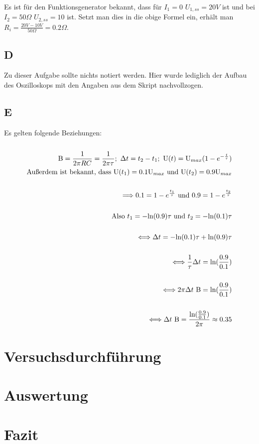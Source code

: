 Es ist für den Funktionsgenerator bekannt, dass für $I_1 = 0$ $U_{1, ss} = 20V$ ist und bei $I_2 = 50\Omega$ $U_{2, ss} = 10$ ist. Setzt man dies in die obige Formel ein, erhält man $R_i = \frac{20V - 10V}{50\Omega} = 0.2\Omega$.


\section{D}
Zu dieser Aufgabe sollte nichts notiert werden. Hier wurde lediglich der Aufbau des Oszilloskops mit den Angaben aus dem Skript nachvollzogen.

\section{E}
Es gelten folgende Beziehungen: \\ \\
\begin{align*}
 \text B = \frac{1}{2\pi RC} = \frac{1}{2\pi \tau}; \text{ } \Delta t = t_2 - t_1; \text{ } \text U(t) = \text U_{max} (1 - e ^{- \frac{t}{\tau}}) \\
\text{Außerdem ist bekannt, dass } \text U(t_1) = 0.1 \text U_{max} \text{ und } \text U(t_2) = 0.9 \text U_{max}\\ \\
\Longrightarrow 0.1 = 1 - e ^{\frac{t_1}{\tau}} \text{ und } 0.9 = 1 - e ^{\frac{t_2}{\tau}} \\ \\
\text{Also } t_1 = - \text {ln}(0.9)\tau \text{ und } t_2 = - \text {ln}(0.1)\tau \\ \\
 \Longleftrightarrow \Delta t = - \text{ln}(0.1) \tau + \text{ln} (0.9) \tau  \\ \\
 \Longleftrightarrow \frac{1}{\tau} \Delta t = \text{ln} (\frac{0.9}{0.1}) \\ \\
 \Longleftrightarrow 2\pi \Delta t \text{ B}  = \text{ln} (\frac{0.9}{0.1}) \\ \\
 \Longleftrightarrow \Delta t \text{ B} = \frac{\text{ln} (\frac{0.9}{0.1})}{2\pi} \approx 0.35
\end{align*}

\chapter{Versuchsdurchführung}

\chapter{Auswertung}

\chapter{Fazit}


